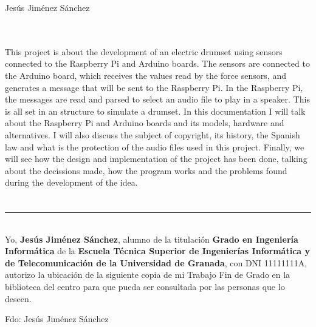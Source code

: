 \begin{center}
    Jesús Jiménez Sánchez\\
\end{center}

\\

\vspace{0.7cm}
\\

This project is about the development of an electric drumset using sensors connected to the Raspberry Pi and Arduino
boards.
The sensors are connected to the Arduino board, which receives the values read by the force sensors, and generates a
message that will be sent to the Raspberry Pi.
In the Raspberry Pi, the messages are read and parsed to select an audio file to play in a speaker.
This is all set in an structure to simulate a drumset.
In this documentation I will talk about the Raspberry Pi and Arduino boards and its models, hardware and alternatives. I
will also discuss the subject of copyright, its history, the Spanish law and what is the protection of the audio files
used in this project.
Finally, we will see how the design and implementation of the project has been done, talking about the decissions made,
how the program works and the problems found during the development of the idea.

\chapter*{}   %

\thispagestyle{empty}

\noindent\rule[-1ex]{\textwidth}{2pt}\\[4.5ex]

Yo, \textbf{Jesús Jiménez Sánchez}, alumno de la titulación \textbf{Grado en Ingeniería Informática} de la
\textbf{Escuela Técnica Superior de Ingenierías Informática y de Telecomunicación de la Universidad de Granada}, con DNI
11111111A, autorizo la ubicación de la siguiente copia de mi Trabajo Fin de Grado en la biblioteca del centro para que
pueda ser consultada por las personas que lo deseen.

\vspace{6cm}

\noindent Fdo: Jesús Jiménez Sánchez

\vspace{2cm}

